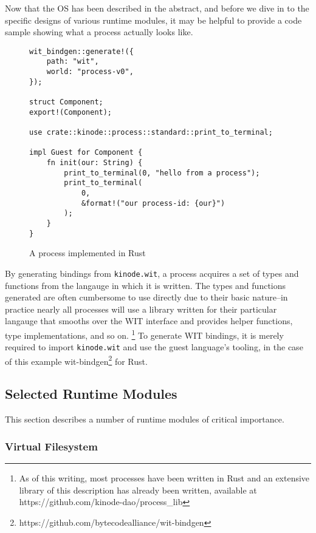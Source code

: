 \documentclass[runningheads]{llncs}
\begin{document}
Now that the OS has been described in the abstract, and before we dive in to the specific designs of various runtime modules, it may be helpful to provide a code sample showing what a process actually looks like.

\begin{figure}[H]
\begin{verbatim}
wit_bindgen::generate!({
    path: "wit",
    world: "process-v0",
});

struct Component;
export!(Component);

use crate::kinode::process::standard::print_to_terminal;

impl Guest for Component {
    fn init(our: String) {
        print_to_terminal(0, "hello from a process");
        print_to_terminal(
            0,
            &format!("our process-id: {our}")
        );
    }
}
\end{verbatim}
    \caption{A process implemented in Rust}
    \label{fig:example process}
\end{figure}

By generating bindings from \verb|kinode.wit|, a process acquires a set of types and functions from the langauge in which it is written.
The types and functions generated are often cumbersome to use directly due to their basic nature–in practice nearly all processes will use a library written for their particular langauge that smooths over the WIT interface and provides helper functions, type implementations, and so on.
\footnote{ As of this writing, most processes have been written in Rust and an extensive library of this description has already been written, available at https://github.com/kinode-dao/process\_lib }
To generate WIT bindings, it is merely required to import \verb|kinode.wit| and use the guest language's tooling, in the case of this example wit-bindgen\footnote{https://github.com/bytecodealliance/wit-bindgen} for Rust.

\subsection{Selected Runtime Modules}
\label{sec:osmodules}

This section describes a number of runtime modules of critical importance.

\subsubsection{Virtual Filesystem}
\label{sec:osvfs}
\end{document}
